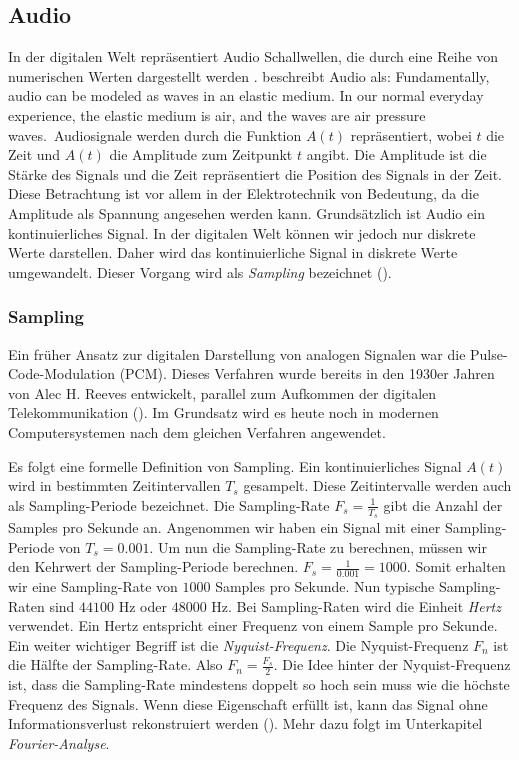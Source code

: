 \documentclass[11pt,a4paper]{article}
\begin{document}
\subsection{Audio}
In der digitalen Welt repräsentiert Audio Schallwellen, die durch eine Reihe von numerischen Werten 
dargestellt werden \cite[p.9]{somberg2019audioapi}. beschreibt Audio als: \glqq Fundamentally, 
audio can be modeled as waves in an elastic medium. In our normal everyday experience, the elastic 
medium is air, and the waves are air pressure waves.\grqq \ Audiosignale werden durch die Funktion
\(A(t)\) repräsentiert, wobei \(t\) die Zeit und \(A(t)\) die Amplitude zum
Zeitpunkt \(t\) angibt. Die Amplitude ist die Stärke des Signals und die Zeit repräsentiert die
Position des Signals in der Zeit. Diese Betrachtung ist vor allem in der Elektrotechnik
von Bedeutung, da die Amplitude als Spannung angesehen werden kann. Grundsätzlich ist Audio ein
kontinuierliches Signal. In der digitalen Welt können wir jedoch nur diskrete Werte darstellen.
Daher wird das kontinuierliche Signal in diskrete Werte umgewandelt. Dieser Vorgang wird als
\textit{Sampling} bezeichnet (\cite[Chapter~3.1]{tarr2018hackaudio}). 


\subsubsection{Sampling}
Ein früher Ansatz zur digitalen Darstellung von analogen Signalen war die Pulse-Code-Modulation
(PCM). Dieses Verfahren wurde bereits in den 1930er Jahren von Alec H. Reeves entwickelt,
parallel zum Aufkommen der digitalen Telekommunikation (\cite[p.~57]{deloraine1965pcm}).
Im Grundsatz wird es heute noch in modernen Computersystemen nach dem gleichen Verfahren angewendet.

\noindent
\newline
Es folgt eine formelle Definition von Sampling. Ein kontinuierliches Signal \(A(t)\)
wird in bestimmten Zeitintervallen \(T_s\) gesampelt. Diese Zeitintervalle werden auch als
Sampling-Periode bezeichnet. Die Sampling-Rate \(F_s = \displaystyle\frac{1}{T_s}\) gibt die Anzahl
der Samples pro Sekunde an. Angenommen wir haben ein Signal mit einer Sampling-Periode
von \(T_s = 0.001\). Um nun die Sampling-Rate zu berechnen, müssen wir den Kehrwert der
Sampling-Periode berechnen. \(F_s = \displaystyle\frac{1}{0.001} = 1000\). Somit erhalten wir eine
Sampling-Rate von \(1000\) Samples pro Sekunde. Nun typische Sampling-Raten sind \(44100\) Hz
oder \(48000\) Hz. Bei Sampling-Raten wird die Einheit \textit{Hertz} verwendet. Ein Hertz entspricht
einer Frequenz von einem Sample pro Sekunde. Ein weiter wichtiger Begriff ist die
\textit{Nyquist-Frequenz}. Die Nyquist-Frequenz \(F_n\) ist die Hälfte der Sampling-Rate.
Also \(F_n = \displaystyle\frac{F_s}{2}\). Die Idee hinter der Nyquist-Frequenz ist, dass die
Sampling-Rate mindestens doppelt so hoch sein muss wie die höchste Frequenz des Signals. Wenn diese
Eigenschaft erfüllt ist, kann das Signal ohne Informationsverlust rekonstruiert werden 
(\cite[Chapter~3.1]{tarr2018hackaudio}). Mehr dazu folgt im Unterkapitel 
\textit{Fourier-Analyse}.
\end{document}
